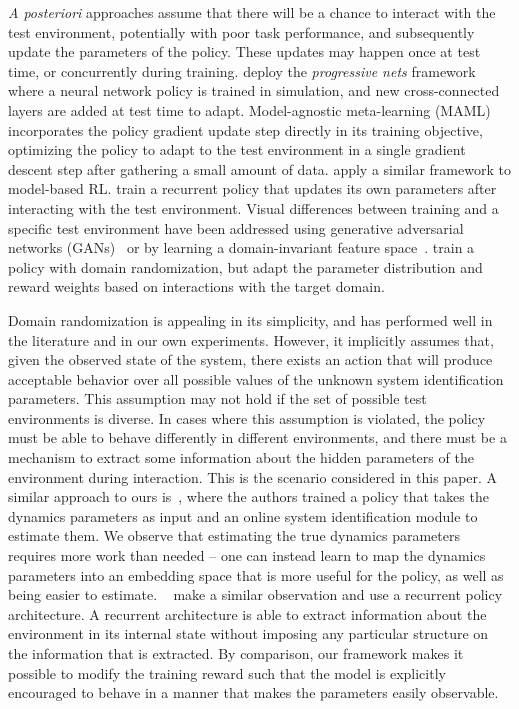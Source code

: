\documentclass{article}
\newcommand{\TODO}[1]{\textcolor{red}{\textbf{TODO: #1}}}
\begin{document}
\emph{A posteriori} approaches assume that there will be a chance to interact with the test environment,
potentially with poor task performance,
and subsequently update the parameters of the policy.
These updates may happen once at test time, or concurrently during training.
%
\citet{rusu-progressive-nets} deploy the \emph{progressive nets} framework
where a neural network policy is trained in simulation, and new cross-connected layers are added
at test time to adapt.
%
Model-agnostic meta-learning (MAML)~\citep{finn-maml-icml17} incorporates the policy gradient update step directly in its training objective,
optimizing the policy to adapt to the test environment in a single gradient descent step after gathering a small amount of data.
\citet{clavera-maml-model} apply a similar framework to model-based RL.
%
\citet{duan-rl2} train a recurrent policy that updates its own parameters after interacting with the test environment.
%
Visual differences between training and a specific test environment have been addressed
using generative adversarial networks (GANs)~\citep{bousmalis-domain-gan-cvpr17}
or by learning a domain-invariant feature space~\citep{bousmalis-domainseparation-nips16}.
%
%
\citet{rajeswaran-epopt-corr16} train a policy with domain randomization, but
adapt the parameter distribution and reward weights based on interactions with the target domain.

Domain randomization is appealing in its simplicity, and has performed well in the literature and in our own experiments.
However, it implicitly assumes that, given the observed state of the system,
there exists an action that will produce acceptable behavior over all possible values
of the unknown system identification parameters.
This assumption may not hold if the set of possible test environments is diverse.
%
In cases where this assumption is violated, the policy must be able to behave differently in different environments,
and there must be a mechanism to extract some information about the hidden parameters of the environment during interaction.
This is the scenario considered in this paper.
A similar approach to ours is~\citet{yu-up-osi-rss17},
where the authors trained a policy that takes the dynamics parameters as input
and an online system identification module to estimate them.
We observe that estimating the true dynamics parameters requires more work than needed --
one can instead learn to map the dynamics parameters into an embedding space
that is more useful for the policy, as well as being easier to estimate.
~\citet{peng-dynamics-randomization-corr17} make a similar observation and use a recurrent policy architecture.
A recurrent architecture is able to extract information about the environment in its internal state without imposing any particular structure on the information that is extracted.
By comparison, our framework makes it possible to modify the training reward such that the model is explicitly encouraged to behave in a manner that makes the parameters easily observable.
\end{document}
